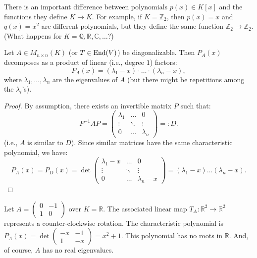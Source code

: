 \begin{importantremark}\label{rem:poly_vs_func}
  There is an important difference between polynomials $p(x) \in K[x]$ and the functions they define $K \rightarrow K$.
  For example, if $K = \mathbb{Z}_2$, then $p(x) = x$ and $q(x) = x^2$ are different polynomials, but they define the same function $\mathbb{Z}_2 \rightarrow \mathbb{Z}_2$. (What happens for $K = \mathbb{Q}, \mathbb{R}, \mathbb{C}, \dots$?)
\end{importantremark}

\begin{lemma} \label{lem:diag_decomp}
  Let $A \in M_{n \times n}(K)$ (or $T \in \operatorname{End}(V)$) be diagonalizable. Then $P_A(x)$ decomposes as a product of linear (i.e., degree $1$) factors:
  \[ P_A(x) = (\lambda_1 - x) \cdot \dots \cdot (\lambda_n - x), \]
  where $\lambda_1, \dots, \lambda_n$ are the eigenvalues of $A$ (but there might be repetitions among the $\lambda_i$'s).
\end{lemma}

\begin{proof}
  By assumption, there exists an invertible matrix $P$ such that:
  \begin{equation} \label{eq:diagonal_similarity}
    P^{-1}AP = \begin{pmatrix} \lambda_1 & \dots & 0 \\ \vdots & \ddots & \vdots \\ 0 & \dots & \lambda_n \end{pmatrix} =: D.
  \end{equation}
  (i.e., $A$ is similar to $D$).
  Since similar matrices have the same characteristic polynomial, we have:
  \[ P_A(x) = P_D(x) = \det \begin{pmatrix} \lambda_1 - x & \dots & 0 \\ \vdots & \ddots & \vdots \\ 0 & \dots & \lambda_n - x \end{pmatrix} = (\lambda_1 - x) \dots (\lambda_n - x). \]
\end{proof}

\begin{example}\label{ex:no_real_eigenvalues}
  Let $A = \left(\begin{smallmatrix} 0 & -1 \\ 1 & 0 \end{smallmatrix}\right)$ over $K = \mathbb{R}$. The associated linear map $T_A : \mathbb{R}^2 \rightarrow \mathbb{R}^2$ represents a counter-clockwise rotation.
  The characteristic polynomial is $P_A(x) = \det\left(\begin{smallmatrix} -x & -1 \\ 1 & -x \end{smallmatrix}\right) = x^2 + 1$.
  This polynomial has no roots in $\mathbb{R}$. And, of course, $A$ has no real eigenvalues.
\end{example}


